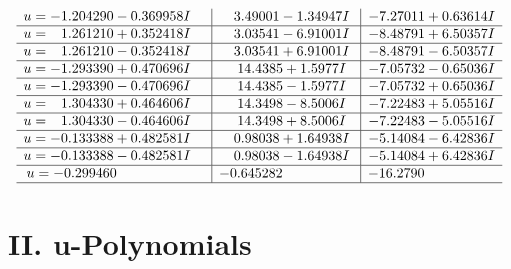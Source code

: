 \documentclass[1p]{elsarticle_modified}
\theoremstyle{definition}
\begin{document}
$$\begin{array}{c|c|c}
\begin{aligned}
u &= -1.204290 - 0.369958 I\end{aligned}
 & \phantom{-}3.49001 - 1.34947 I & -7.27011 + 0.63614 I \\ \hline\begin{aligned}
u &= \phantom{-}1.261210 + 0.352418 I\end{aligned}
 & \phantom{-}3.03541 - 6.91001 I & -8.48791 + 6.50357 I \\ \hline\begin{aligned}
u &= \phantom{-}1.261210 - 0.352418 I\end{aligned}
 & \phantom{-}3.03541 + 6.91001 I & -8.48791 - 6.50357 I \\ \hline\begin{aligned}
u &= -1.293390 + 0.470696 I\end{aligned}
 & \phantom{-}14.4385 + 1.5977 I & -7.05732 - 0.65036 I \\ \hline\begin{aligned}
u &= -1.293390 - 0.470696 I\end{aligned}
 & \phantom{-}14.4385 - 1.5977 I & -7.05732 + 0.65036 I \\ \hline\begin{aligned}
u &= \phantom{-}1.304330 + 0.464606 I\end{aligned}
 & \phantom{-}14.3498 - 8.5006 I & -7.22483 + 5.05516 I \\ \hline\begin{aligned}
u &= \phantom{-}1.304330 - 0.464606 I\end{aligned}
 & \phantom{-}14.3498 + 8.5006 I & -7.22483 - 5.05516 I \\ \hline\begin{aligned}
u &= -0.133388 + 0.482581 I\end{aligned}
 & \phantom{-}0.98038 + 1.64938 I & -5.14084 - 6.42836 I \\ \hline\begin{aligned}
u &= -0.133388 - 0.482581 I\end{aligned}
 & \phantom{-}0.98038 - 1.64938 I & -5.14084 + 6.42836 I \\ \hline\begin{aligned}
u &= -0.299460\phantom{ +0.000000I}\end{aligned}
 & -0.645282\phantom{ +0.000000I} & -16.2790\phantom{ +0.000000I}\\
 \hline 
 \end{array}$$\newpage
\newpage\renewcommand{\arraystretch}{1}
\centering \section*{ II. u-Polynomials}
\end{document}
